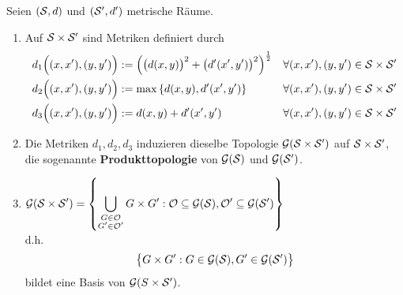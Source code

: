 \begin{satz}\label{Satz2.10} %
	Seien $(\S,d)$ und $(\S',d')$ metrische Räume.
	\begin{enumerate}[label={(\arabic*)}]
		\item Auf $\S\times\S'$ sind Metriken definiert durch
		\begin{align*}
			d_1\Big((x,x'),(y,y')\Big)&:=\left( \big(d(x,y)\big)^2+\big(d'(x',y')\big)^2\right)^{\frac{1}{2}} &\forall(x,x'),(y,y')\in \S\times\S'\\
			d_2\Big((x,x'),(y,y')\Big)&:=\max \left\lbrace d(x,y),d'(x',y')\right\rbrace &\forall(x,x'),(y,y')\in \S\times\S'\\
			d_3\Big((x,x'),(y,y')\Big)&:=d(x,y)+d'(x',y') &\forall(x,x'),(y,y')\in \S\times\S'
		\end{align*}
		\item Die Metriken $d_1,d_2,d_3$ induzieren dieselbe Topologie $\mathcal{G}(\S\times \S')$ auf $\S\times\S'$, 
		die sogenannte \textbf{Produkttopologie} von $\mathcal{G}(\S)$ und $\mathcal{G}(\S')$.
		\item $\begin{aligned}
			\mathcal{G}(\S\times\S')=\left\lbrace\bigcup\limits_{\begin{subarray}{c}
				G\in\mathcal{O}\\ G'\in\mathcal{O}'
			\end{subarray}}G\times G':\mathcal{O}\subseteq\mathcal{G}(\S),\mathcal{O}'\subseteq\mathcal{G}(\S')\right\rbrace
		\end{aligned}$\\
		d.h.
		\begin{align*}
			\big\lbrace G\times G':G\in\mathcal{G}(\S),G'\in\mathcal{G}(\S')\big\rbrace
		\end{align*}
		bildet eine Basis von $\mathcal{G}(S\times\S')$.
	\end{enumerate}
\end{satz}

